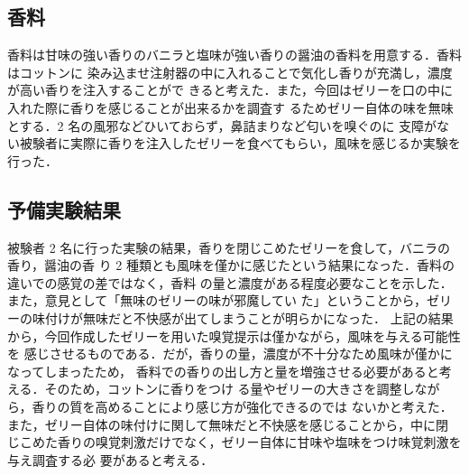 \subsection{香料}
香料は甘味の強い香りのバニラと塩味が強い香りの醤油の香料を用意する．香料はコットンに
染み込ませ注射器の中に入れることで気化し香りが充満し，濃度が高い香りを注入することがで
きると考えた．また，今回はゼリーを口の中に入れた際に香りを感じることが出来るかを調査す
るためゼリー自体の味を無味とする．2 名の風邪などひいておらず，鼻詰まりなど匂いを嗅ぐのに
支障がない被験者に実際に香りを注入したゼリーを食べてもらい，風味を感じるか実験を行った．

\subsection{予備実験結果}
被験者 2 名に行った実験の結果，香りを閉じこめたゼリーを食して，バニラの香り，醤油の香
り 2 種類とも風味を僅かに感じたという結果になった．香料の違いでの感覚の差ではなく，香料
の量と濃度がある程度必要なことを示した．また，意見として「無味のゼリーの味が邪魔してい
た」ということから，ゼリーの味付けが無味だと不快感が出てしまうことが明らかになった．
上記の結果から，今回作成したゼリーを用いた嗅覚提示は僅かながら，風味を与える可能性を
感じさせるものである．だが，香りの量，濃度が不十分なため風味が僅かになってしまったため，
香料での香りの出し方と量を増強させる必要があると考える．そのため，コットンに香りをつけ
る量やゼリーの大きさを調整しながら，香りの質を高めることにより感じ方が強化できるのでは
ないかと考えた．また，ゼリー自体の味付けに関して無味だと不快感を感じることから，中に閉
じこめた香りの嗅覚刺激だけでなく，ゼリー自体に甘味や塩味をつけ味覚刺激を与え調査する必
要があると考える．
